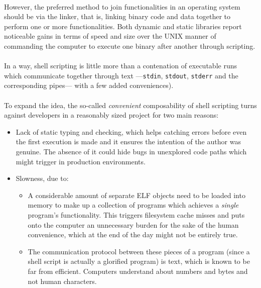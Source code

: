 \documentclass[12pt]{article}
\begin{document}
	\paragraph{}However, the preferred method to join functionalities in an operating system should be via the linker, that is, linking binary code and data together to perform one or more functionalities. Both dynamic and static libraries report noticeable gains in terms of speed and size over the UNIX manner of commanding the computer to execute one binary after another through scripting.
	\paragraph{}In a way, shell scripting is little more than a contenation of executable runs which communicate together through text ---\verb|stdin|, \verb|stdout|, \verb|stderr| and the corresponding pipes--- with a few added conveniences).
	\paragraph{}To expand the idea, the so-called \textit{convenient} composability of shell scripting turns against developers in a reasonably sized project for two main reasons:
	
	\begin{itemize}
		\item Lack of static typing and checking, which helps catching errors before even the first execution is made and it ensures the intention of the author was genuine. The absence of it could hide bugs in unexplored code paths which might trigger in production environments.
		\item Slowness, due to:
		\begin{itemize}
			\item A considerable amount of separate \acrshort{ELF} objects need to be loaded into memory to make up a collection of programs which achieves a \textit{single} program's functionality. This triggers filesystem cache misses and puts onto the computer an unnecessary burden for the sake of the human convenience, which at the end of the day might not be entirely true.
			\item The communication protocol between these pieces of a program (since a shell script is actually a glorified program) is text, which is known to be far from efficient. Computers understand about numbers and bytes and not human characters.
		\end{itemize}
	\end{itemize}
	
\end{document}
